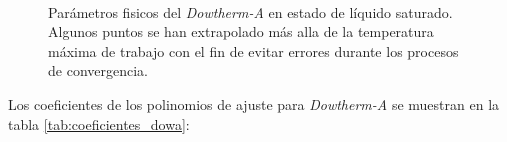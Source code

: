 \begin{figure}
  \\
 \caption[Parámetros fisicos del \emph{Dowtherm-A} en estado de líquido saturado]{Parámetros fisicos del \emph{Dowtherm-A} en estado de líquido saturado. Algunos puntos se han extrapolado más alla de la temperatura máxima de trabajo con el fin de evitar errores durante los procesos de convergencia.}
\label{f:parametros_dowa}
\end{figure}

Los coeficientes de los polinomios de ajuste para \emph{Dowtherm-A} se muestran en la tabla \ref{tab:coeficientes_dowa}:

